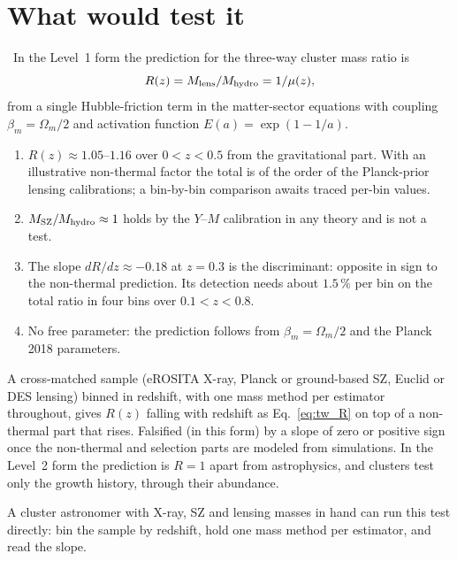 \section{What would test it}\label{sec:tw_test}
\prediction\ In the Level~1 form the prediction for the three-way cluster mass ratio is
\begin{equation*}
R(z)=M_{\rm lens}/M_{\rm hydro}=1/\mu(z),
\end{equation*}
from a single Hubble-friction term in the matter-sector equations with coupling $\beta_m=\Omega_m/2$ and activation function $E(a)=\exp(1-1/a)$.
\begin{enumerate}
\item $R(z)\approx1.05$--$1.16$ over $0<z<0.5$ from the gravitational part. With an illustrative non-thermal factor the total is of the order of the
Planck-prior lensing calibrations; a bin-by-bin comparison awaits traced per-bin values.
\item $M_{\rm SZ}/M_{\rm hydro}\approx1$ holds by the $Y$--$M$ calibration in any theory and is not a test.
\item The slope $dR/dz\approx-0.18$ at $z=0.3$ is the discriminant: opposite in sign to the non-thermal prediction. Its detection needs about $1.5\,\%$
per bin on the total ratio in four bins over $0.1<z<0.8$.
\item No free parameter: the prediction follows from $\beta_m=\Omega_m/2$ and the Planck 2018 parameters.
\end{enumerate}
A cross-matched sample (eROSITA X-ray, Planck or ground-based SZ, Euclid or DES lensing) binned in redshift, with one mass method per estimator
throughout, gives $R(z)$ falling with redshift as Eq.~\eqref{eq:tw_R} on top of a non-thermal part that rises. Falsified (in this form) by a slope of
zero or positive sign once the non-thermal and selection parts are modeled from simulations. In the Level~2 form the prediction is $R=1$ apart from
astrophysics, and clusters test only the growth history, through their abundance.

A cluster astronomer with X-ray, SZ and lensing masses in hand can run this test directly: bin the sample by redshift, hold one mass method per estimator, and read the slope.

